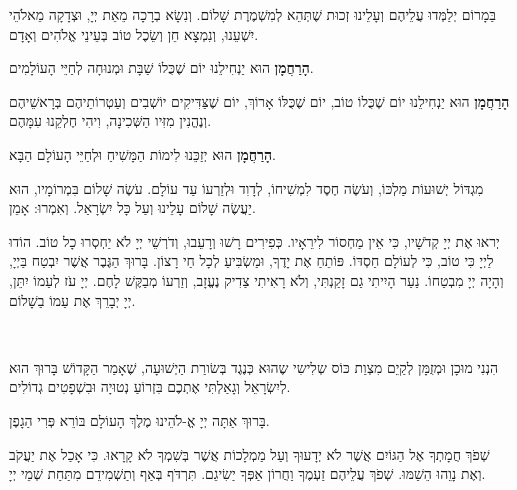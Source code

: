 בַּמָרוֹם יְלַמְּדוּ עֲלֵיהֶם וְעָלֵינוּ זְכוּת שֶׁתְּהֵא לְמִשְׁמֶרֶת שָׁלוֹם. וְנִשָׂא בְרָכָה מֵאֵת יְיָ, וּצְדָקָה מֵאלֹהֵי יִשְׁעֵנוּ, וְנִמְצָא חֵן וְשֵׂכֶל טוֹב בְּעֵינֵי אֱלֹהִים וְאָדָם.


\begin{framed}

{\bf הָרַחֲמָן}
הוּא יַנְחִילֵנוּ יוֹם שֶׁכֻּלוֹ שַׁבָּת וּמְנוּחָה לְחַיֵּי הָעוֹלָמִים.
\end{framed}

{\bf הָרַחֲמָן}
הוּא יַנְחִילֵנוּ יוֹם שֶׁכֻּלוֹ טוֹב, יוֹם שֶׁכֻּלּוֹ אָרוֹךְ, יוֹם שֶׁצַּדִּיקִים יוֹשְׁבִים וְעַטְרוֹתֵיהֶם בְּרָאשֵׁיהֶם וְנֶהֱנִין מִזִּיו הַשְּׁכִינָה, וִיהִי חֶלְקֵנוּ עִמָּהֶם.

{\bf הָרַחֲמָן}
הוּא יְזַכֵּנוּ לִימוֹת הַמָּשִׁיחַ וּלְחַיֵּי הָעוֹלָם הַבָּא.

מִגְדּוֹל יְשׁוּעוֹת מַלְכּוֹ, וְעֹשֶׂה חֶסֶד לִמְשִׁיחוֹ, לְדָוִד וּלְזַרְעוֹ עַד עוֹלָם. עֹשֶׂה שָׁלוֹם בִּמְרוֹמָיו, הוּא יַעֲשֶׂה שָׁלוֹם עָלֵינוּ וְעַל כָּל יִשְׂרָאַל. וְאִמְרוּ: אָמֵן.

יְראוּ אֶת יְיָ קְדֹשָׁיו, כִּי אֵין מַחְסוֹר לִירֵאָיו. כְּפִירִים רָשׁוּ וְרָעֵבוּ, וְדֹרְשֵׁי יְיָ לֹא יַחְסְרוּ כָל טוֹב. הוֹדוּ לַיְיָ כִּי טוֹב, כִּי לְעוֹלָם חַסְדּוֹ. פּוֹתֵחַ אֶת יָדֶךָ, וּמַשְׂבִּיעַ לְכָל חַי רָצוֹן. בָּרוּךְ הַגֶּבֶר אֲשֶׁר יִבְטַח בַּיְיָ, וְהָיָה יְיָ מִבְטַחוֹ. נַעַר הָיִיתִי גַם זָקַנְתִּי, וְלֹא רָאִיתִי צַדִיק נֶעֱזָב, וְזַרְעוֹ מְבַקֶּשׁ לָחֶם. יְיָ עֹז לְעַמוֹ יִתֵּן, יְיָ יְבָרֵךְ אֶת עַמוֹ בַשָׁלוֹם.

\ \\


הִנְנִי מוּכָן וּמְזֻמָּן לְקַיֵם מִצְוַת כּוֹס שְלִישִי שֶהוּא כְּנֶגֶד בְּשׂורַת הַיְשׁוּעָה, שֶׁאָמַר הַקָּדוֹשׁ בָּרוּךְ הוּא לְיִשְׂרָאֵל וְגָאַלְתִּי אֶתְכֶם בִּזְרוֹעַ נְטוּיָה וּבִשְׁפָטִים גְדוֹלִים.

בָּרוּךְ אַתָּה יְיָ אֱ-לֹהֵינוּ מֶלֶךְ הָעוֹלָם בּוֹרֵא פְּרִי הַגָפֶן.



שְׁפֹךְ חֲמָתְךָ אֶל הַגּוֹיִם אֲשֶׁר לֹא יְדָעוּךָ וְעַל מַמְלָכוֹת אֲשֶׁר בְּשִׁמְךָ לֹא קָרָאוּ. כִּי אָכַל אֶת יַעֲקֹב וְאֶת נָוֵהוּ הֵשַׁמּוּ. שְׁפֹךְ עֲלֵיהֶם זַעְמֶךָ וַחֲרוֹן אַפְּךָ יַשִׂיגֵם. תִּרְדֹּף בְּאַף וְתַשְׁמִידֵם מִתַּחַת שְׁמֵי יְיָ.